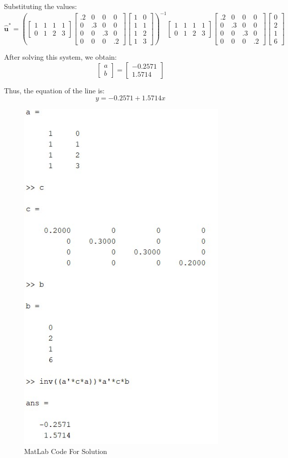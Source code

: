 \documentclass[11pt]{article}
\begin{document}
Substituting the values:
\[
\hat{\mathbf{u}}^* = 
\left( 
\begin{bmatrix} 
1 & 1 & 1 & 1 \\ 
0 & 1 & 2 & 3 
\end{bmatrix}
\begin{bmatrix}
.2 & 0 & 0 & 0 \\
0 & .3 & 0 & 0 \\
0 & 0 & .3 & 0 \\
0 & 0 & 0 & .2
\end{bmatrix}
\begin{bmatrix} 
1 & 0 \\
1 & 1 \\
1 & 2 \\
1 & 3 
\end{bmatrix}
\right)^{-1}
\begin{bmatrix} 
1 & 1 & 1 & 1 \\ 
0 & 1 & 2 & 3 
\end{bmatrix}
\begin{bmatrix}
.2 & 0 & 0 & 0 \\
0 & .3 & 0 & 0 \\
0 & 0 & .3 & 0 \\
0 & 0 & 0 & .2
\end{bmatrix}
\begin{bmatrix}
0 \\
2 \\
1 \\
6
\end{bmatrix}
\]

After solving this system, we obtain:
\[
\begin{bmatrix}
a \\
b
\end{bmatrix} =
\begin{bmatrix}
-0.2571 \\
1.5714
\end{bmatrix}
\]

Thus, the equation of the line is:
\[\boxed{
y = -0.2571 + 1.5714x}
\]

\begin{figure}[!ht]
  \centering
  \includegraphics[width=0.91\textwidth, height=0.77\textwidth]{images/prob2.jpg}
  \caption{MatLab Code For Solution}
  \label{fig:1}
\end{figure}
\FloatBarrier
\end{document}
